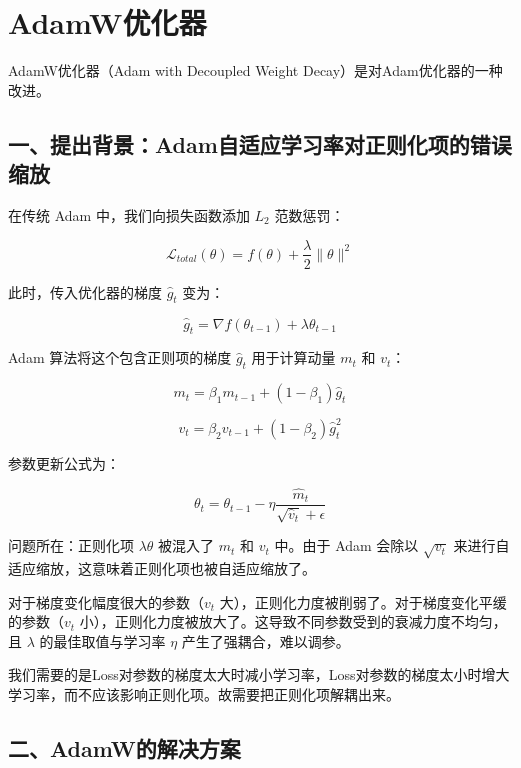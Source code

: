 \clearpage

\hypertarget{adamwux4f18ux5316ux5668}{%
\section{AdamW优化器}\label{adamwux4f18ux5316ux5668}}

AdamW优化器（Adam with Decoupled Weight Decay）是对Adam优化器的一种改进。

\hypertarget{ux4e00ux63d0ux51faux80ccux666fadamux81eaux9002ux5e94ux5b66ux4e60ux7387ux5bf9ux6b63ux5219ux5316ux9879ux7684ux9519ux8befux7f29ux653e}{%
\subsection{一、提出背景：Adam自适应学习率对正则化项的错误缩放}\label{ux4e00ux63d0ux51faux80ccux666fadamux81eaux9002ux5e94ux5b66ux4e60ux7387ux5bf9ux6b63ux5219ux5316ux9879ux7684ux9519ux8befux7f29ux653e}}

在传统 Adam 中，我们向损失函数添加 \(L_2\) 范数惩罚：

\[
\mathcal{L}_{total}(\theta) = f(\theta) + \frac{\lambda}{2}\lVert\theta\rVert^2
\]

此时，传入优化器的梯度 \(\hat{g}_t\) 变为：

\[
\hat{g}_t = \nabla f(\theta_{t-1}) + \lambda\theta_{t-1}
\]

Adam 算法将这个包含正则项的梯度 \(\hat{g}_t\) 用于计算动量 \(m_t\) 和 \(v_t\)：

\[
m_t = \beta_1m_{t-1} + (1-\beta_1)\hat{g}_t
\]

\[
v_t = \beta_2v_{t-1} + (1-\beta_2)\hat{g}_t^2
\]

参数更新公式为：

\[
\theta_t = \theta_{t-1} - \eta\frac{\hat{m}_t}{\sqrt{\hat{v}_t}+\epsilon}
\]

问题所在：正则化项 \(\lambda\theta\) 被混入了 \(m_t\) 和 \(v_t\) 中。由于 Adam 会除以 \(\sqrt{v_t}\) 来进行自适应缩放，这意味着正则化项也被自适应缩放了。

对于梯度变化幅度很大的参数（\(v_t\) 大），正则化力度被削弱了。对于梯度变化平缓的参数（\(v_t\) 小），正则化力度被放大了。这导致不同参数受到的衰减力度不均匀，且 \(\lambda\) 的最佳取值与学习率 \(\eta\) 产生了强耦合，难以调参。

我们需要的是Loss对参数的梯度太大时减小学习率，Loss对参数的梯度太小时增大学习率，而不应该影响正则化项。故需要把正则化项解耦出来。

\hypertarget{ux4e8cadamwux7684ux89e3ux51b3ux65b9ux6848}{%
\subsection{二、AdamW的解决方案}\label{ux4e8cadamwux7684ux89e3ux51b3ux65b9ux6848}}

